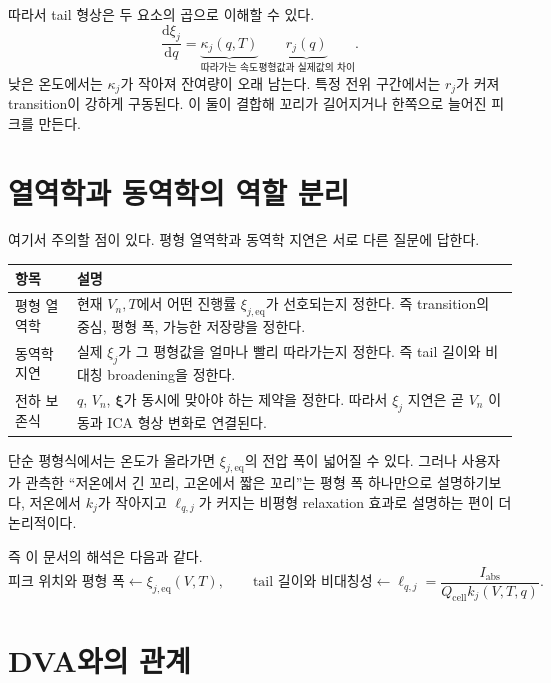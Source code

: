 \documentclass[11pt,a4paper]{article}
\newcommand{\dd}{\mathrm{d}}
\newcommand{\cell}{\mathrm{cell}}
\newcommand{\eqs}{\mathrm{eq}}
\newcommand{\absI}{I_{\mathrm{abs}}}
\begin{document}
따라서 tail 형상은 두 요소의 곱으로 이해할 수 있다.
\begin{equation}
\frac{\dd \xi_j}{\dd q}
=
\underbrace{\kappa_j(q,T)}_{\text{따라가는 속도}}
\underbrace{r_j(q)}_{\text{평형값과 실제값의 차이}}.
\label{eq:tail_two_factors}
\end{equation}
낮은 온도에서는 \(\kappa_j\)가 작아져 잔여량이 오래 남는다. 특정 전위 구간에서는 \(r_j\)가 커져 transition이 강하게 구동된다. 이 둘이 결합해 꼬리가 길어지거나 한쪽으로 늘어진 피크를 만든다.

\section{열역학과 동역학의 역할 분리}

여기서 주의할 점이 있다. 평형 열역학과 동역학 지연은 서로 다른 질문에 답한다.

\begin{longtable}{p{} p{}}
\toprule
항목 & 설명 \\
\midrule
\endhead
평형 열역학 & 현재 \(V_n,T\)에서 어떤 진행률 \(\xi_{j,\eqs}\)가 선호되는지 정한다. 즉 transition의 중심, 평형 폭, 가능한 저장량을 정한다. \\
동역학 지연 & 실제 \(\xi_j\)가 그 평형값을 얼마나 빨리 따라가는지 정한다. 즉 tail 길이와 비대칭 broadening을 정한다. \\
전하 보존식 & \(q\), \(V_n\), \(\bm{\xi}\)가 동시에 맞아야 하는 제약을 정한다. 따라서 \(\xi_j\) 지연은 곧 \(V_n\) 이동과 ICA 형상 변화로 연결된다. \\
\bottomrule
\end{longtable}

단순 평형식에서는 온도가 올라가면 \(\xi_{j,\eqs}\)의 전압 폭이 넓어질 수 있다. 그러나 사용자가 관측한 ``저온에서 긴 꼬리, 고온에서 짧은 꼬리''는 평형 폭 하나만으로 설명하기보다, 저온에서 \(k_j\)가 작아지고 \(\ell_{q,j}\)가 커지는 비평형 relaxation 효과로 설명하는 편이 더 논리적이다.

즉 이 문서의 해석은 다음과 같다.
\begin{equation}
\boxed{
\text{피크 위치와 평형 폭}
\leftarrow
\xi_{j,\eqs}(V,T),
\qquad
\text{tail 길이와 비대칭성}
\leftarrow
\ell_{q,j}=\frac{\absI}{Q_{\cell}k_j(V,T,q)}.
}
\label{eq:equilibrium_dynamic_split}
\end{equation}

\section{DVA와의 관계}
\end{document}
